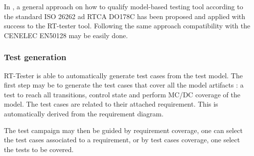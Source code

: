 In \cite{brauer_efficient_2012}, a general approach  on how to qualify
model-based testing tool according to the standard ISO 26262 ad RTCA
DO178C has been proposed and applied with success to the RT-tester
tool. Following the same  approach compatibility with the CENELEC EN50128
may be easily done. 




\subsubsection{Test generation}
RT-Tester is able to automatically generate test cases from the test
model.
The first step may be to generate the test cases that cover all the
model artifacts : a test to reach all transitions, control state and
perform MC/DC coverage of the model. The test cases are
related to their attached requirement. This is automatically derived
from the requirement diagram. 

The test campaign may then be guided by requirement coverage, one
can select the test cases associated to a requirement, or
by test cases coverage, one select the tests to be covered.

